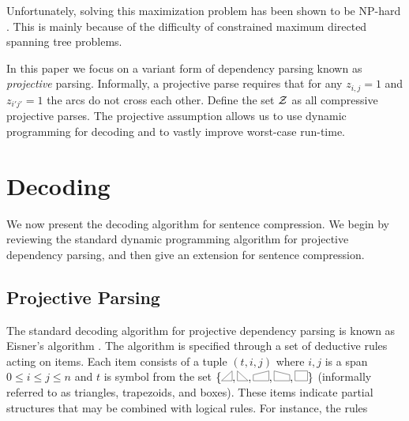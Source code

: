 \documentclass[11pt]{article}
\newcommand{\abox}{\scalebox{0.2}{\tikz{
    \coordinate (A) at (0,0);
    \coordinate (B) at (0,1.5cm);
    \coordinate (C) at (-2cm, 1.5cm);
    \coordinate (D) at (-2cm, 0cm);
    \draw[line width = 0.05cm] (A)--(B)--(C)--(D)--cycle;
    }}}
\newcommand{\rtrap}{\scalebox{0.2}{\tikz{
    \coordinate (A) at (0,0);
    \coordinate (B) at (90:1.5cm);
    \coordinate (C) at (2.5,0.9cm);
    \coordinate (D) at (0:2.5cm);
    \draw[line width = 0.05cm] (A)--(B)--(C)--(D)--cycle;
    }}}
\newcommand{\ltrap}{\scalebox{0.2}{\tikz{
    \coordinate (A) at (0,0);
    \coordinate (B) at (90:1.5cm);
    \coordinate (C) at (-2.5,0.9cm);
    \coordinate (D) at (180:2.5cm);
    \draw[line width = 0.05cm] (A)--(B)--(C)--(D)--cycle;
    }}}
\newcommand{\rtri}{\scalebox{0.2}{\tikz{
    \coordinate (A) at (0,0);
    \coordinate (B) at (90:1.5cm);
    \coordinate (C) at (180:-1.7cm);
    \draw[line width = 0.05cm] (A)--(B)--(C)--cycle;
    }}}
\newcommand{\ltri}{\scalebox{0.2}{\tikz{
    \coordinate (A) at (0,0);
    \coordinate (B) at (90:1.5cm);
    \coordinate (C) at (180:1.7cm);
    \draw[line width = 0.05cm] (A)--(B)--(C)--cycle;
    }}}
\begin{document}
Unfortunately, solving this maximization problem has been shown to be NP-hard \cite{}. This is mainly because of the difficulty of constrained maximum directed spanning tree problems.  

In this paper we focus on a variant form of dependency parsing known
as \textit{projective} parsing. Informally, a projective parse requires that for any $z_{i,j}=1$ and
$z_{i'j'}=1$ the arcs do not cross each other. Define the set ${\cal Z}$ as all compressive projective parses. 
The projective assumption allows us to use dynamic programming for decoding and to vastly improve worst-case
run-time.













\section{Decoding}


We now present the decoding algorithm for sentence compression. We begin by
reviewing the standard dynamic programming algorithm for projective
dependency parsing, and then give an extension for sentence 
compression.

\subsection{Projective Parsing}

The standard decoding algorithm for projective dependency parsing is
known as Eisner's algorithm \cite{eisner, mcdonald}.  The algorithm is
specified through a set of deductive rules acting on items.  Each item
consists of a tuple $(t, i, j)$ where $i, j$ is a span
$0\leq i \leq j \leq n$ and $t$ is symbol from the set
$\{\ltri,\rtri, \ltrap, \rtrap, \abox\}$ (informally referred to as triangles, trapezoids, and boxes). These items indicate partial structures that may be 
combined with logical rules. For instance, the rules
\end{document}
